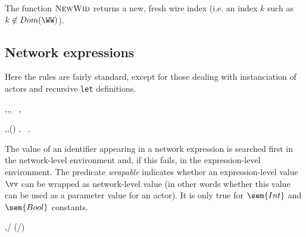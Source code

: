 The function $\textsc{NewWid}$ returns a new, fresh wire index (i.e. an index $k$ such as $k \not\in Dom(\WW)$).


\subsection{Network expressions}
\label{sec:static-network-expressions}

Here the rules are fairly standard, except for those dealing with instanciation of actors and
recursive \texttt{let} definitions.





\infrule[NNVar]
{\NE(\id) = \rho}
{\TE,\EE,\NE \vdash \id \gives \rho,~ \emptyenv,~ \emptyenv}

{\TE,\EE,\NE \vdash \id \gives {}(\vv) ,~ \emptyenv,~ \emptyenv}

The value of an identifier appearing in a network expression is searched first in the network-level
environment and, if this fails, in the expression-level environment. The predicate \emph{wrapable}
indicates whether an expression-level value $\vv$ can be wrapped as network-level value (in other
words whether this value can be used as a parameter value for an actor). It is only true for
$\sem{Int}$ and $\sem{Bool}$ constants.

\infrule[NEConst]
{}
{\TE,\EE \vdash {}/ \gives {}(/)}

